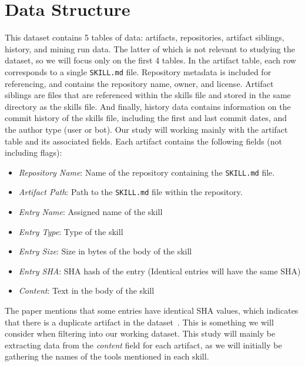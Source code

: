 \section{Data Structure}

This dataset contains 5 tables of data: artifacts, repositories, artifact siblings, history, and mining run data.
The latter of which is not relevant to studying the dataset, so we will focus only on the first 4 tables.
In the artifact table, each row corresponds to a single \texttt{SKILL.md} file.
Repository metadata is included for referencing, and contains the repository name, owner, and license.
Artifact siblings are files that are referenced within the skills file and stored in the same directory as the skills file.
And finally, history data contains information on the commit history of the skills file, including the first and last commit dates, and the author type (user or bot).
Our study will working mainly with the artifact table and its associated fields.
Each artifact contains the following fields (not including flags):

\begin{itemize}
    \item \textit{Repository Name}: Name of the repository containing the \texttt{SKILL.md} file.
    \item \textit{Artifact Path}: Path to the \texttt{SKILL.md} file within the repository.
    \item \textit{Entry Name}: Assigned name of the skill
    \item \textit{Entry Type}: Type of the skill
    \item \textit{Entry Size}: Size in bytes of the body of the skill
    \item \textit{Entry SHA}: SHA hash of the entry (Identical entries will have the same SHA)
    \item \textit{Content}: Text in the body of the skill
\end{itemize}

The paper mentions that some entries have identical SHA values, which indicates that there is a duplicate
artifact in the dataset~\cite{gitskills2027}. This is something we will consider when filtering into our working dataset.
This study will mainly be extracting data from the \textit{content} field for each artifact, as we will initially
be gathering the names of the tools mentioned in each skill.